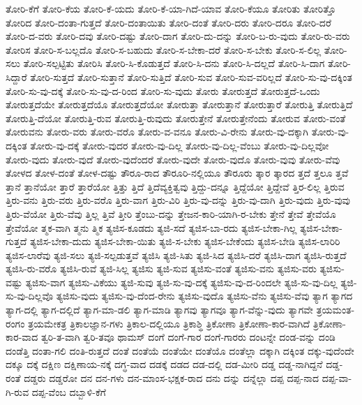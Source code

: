 {ತೋರಿ-ಕೆಗೆ
ತೋರಿ-ಕೆಯ
ತೋರಿ-ಕೆ-ಯದು
ತೋರಿ-ಕೆ-ಯಾ-ಗಿದೆ-ಯಾವ
ತೋರಿ-ಕೆಯೂ
ತೋರಿತು
ತೋರಿತ್ತೊ
ತೋರಿದ
ತೋರಿ-ದಂತಾ-ಗುತ್ತದೆ
ತೋರಿ-ದಂತಾಯಿತು
ತೋರಿ-ದಂತೆ
ತೋರಿ-ದರು
ತೋರಿ-ದರೂ
ತೋರಿ-ದರೆ
ತೋರಿ-ದ-ವರು
ತೋರಿ-ದವು
ತೋರಿ-ದಷ್ಟು
ತೋರಿ-ದಾಗ
ತೋರಿ-ದು-ದನ್ನು
ತೋರಿ-ಬ-ರು-ವುದು
ತೋರಿ-ರು-ವರು
ತೋರಿಸ
ತೋರಿ-ಸ-ಬಲ್ಲದೊ
ತೋರಿ-ಸ-ಬಹುದು
ತೋರಿ-ಸ-ಬೇಕಾ-ದರೆ
ತೋರಿ-ಸ-ಬೇಕು
ತೋರಿ-ಸ-ಲಿಲ್ಲ
ತೋರಿ-ಸಲು
ತೋರಿ-ಸಲ್ಪಟ್ಟಿತು
ತೋರಿಸಿ
ತೋರಿ-ಸಿ-ಕೊಡುತ್ತದೆ
ತೋರಿ-ಸಿ-ದನು
ತೋರಿ-ಸಿ-ದಲ್ಲದೆ
ತೋರಿ-ಸಿ-ದಾಗ
ತೋರಿ-ಸಿದ್ದಾರೆ
ತೋರಿ-ಸುತ್ತದೆ
ತೋರಿ-ಸುತ್ತಾನೆ
ತೋರಿ-ಸುತ್ತಿದೆ
ತೋರಿ-ಸುವ
ತೋರಿ-ಸುವ-ವರಿಲ್ಲದೆ
ತೋರಿ-ಸು-ವು-ದಕ್ಕಿಂತ
ತೋರಿ-ಸು-ವು-ದಕ್ಕೆ
ತೋರಿ-ಸು-ವು-ದ-ರಿಂದ
ತೋರಿ-ಸು-ವುದು
ತೋರು
ತೋರುತ್ತದೆ
ತೋರುತ್ತದೆ-ಒಂದು
ತೋರುತ್ತದೆಯೇ
ತೋರುತ್ತದೆಯೊ
ತೋರುತ್ತದೆಯೋ
ತೋರುತ್ತಾ
ತೋರುತ್ತಾನೆ
ತೋರುತ್ತಾರೆ
ತೋರುತ್ತಿ
ತೋರುತ್ತಿದೆ
ತೋರುತ್ತಿ-ದೆಯೋ
ತೋರುತ್ತಿ-ರುವ
ತೋರುತ್ತಿ-ರುವುದು
ತೋರುತ್ತೇನೆ
ತೋರುತ್ತೇನೆಂದು
ತೋರುವ
ತೋರು-ವಂತೆ
ತೋರುವನು
ತೋರು-ವರು
ತೋರು-ವರೊ
ತೋರು-ವ-ವನೂ
ತೋರು-ವಿ-ರೇನು
ತೋರು-ವು-ದಕ್ಕಾಗಿ
ತೋರು-ವು-ದಕ್ಕಿಂತ
ತೋರು-ವು-ದಕ್ಕೆ
ತೋರು-ವುದರ
ತೋರು-ವು-ದಿಲ್ಲ
ತೋರು-ವು-ದಿಲ್ಲ-ವೆಂಬು
ತೋರು-ವು-ದಿಲ್ಲವೋ
ತೋರು-ವುದು
ತೋರು-ವುದೆ
ತೋರು-ವುದೆಂದರೆ
ತೋರು-ವುದೇ
ತೋರು-ವುದೊ
ತೋರು-ವುವು
ತೋರು-ವೆವು
ತೋಳದ
ತೋಳ-ದಂತೆ
ತೋಳ-ದಷ್ಟು
ತೌರೂ-ರಾದ
ತೌರೂರಿ-ನಲ್ಲಿಯೂ
ತೌರೂರು
ತ್ಕಾರ
ತ್ಕಾರದ
ತ್ತದೆ
ತ್ತಲೂ
ತ್ತವೆ
ತ್ತಾನೆ
ತ್ತಾನೆಯೋ
ತ್ತಾರೆ
ತ್ತಾರೆಯೋ
ತ್ತಿತ್ತು
ತ್ತಿದೆ
ತ್ತಿದೆವ್ಯಕ್ತಿತ್ವವು
ತ್ತಿದ್ದು-ದನ್ನೂ
ತ್ತಿದ್ದೆಯೋ
ತ್ತಿದ್ದೇವೆ
ತ್ತಿರ-ಲಿಲ್ಲ
ತ್ತಿರುವ
ತ್ತಿರು-ವನು
ತ್ತಿರು-ವರು
ತ್ತಿರು-ವರೊ
ತ್ತಿರು-ವಾಗ
ತ್ತಿರು-ವಿರಿ
ತ್ತಿರು-ವು-ದನ್ನು
ತ್ತಿರು-ವು-ದಾಗಿ
ತ್ತಿರು-ವುದು
ತ್ತಿರು-ವುವು
ತ್ತಿರು-ವೆಯೋ
ತ್ತಿರು-ವೆವು
ತ್ತಿಲ್ಲ
ತ್ತಿವೆ
ತ್ತೀರಿ
ತ್ತೆಂಬು-ದನ್ನು
ತ್ತೇಜನ-ಕಾರಿ-ಯಾಗಿ-ರ-ಬೇಕು
ತ್ತೇನೆ
ತ್ತೇವೆ
ತ್ತೇವೆಯೊ
ತ್ತೇವೆಯೋ
ತ್ಮಕ-ವಾಗಿ
ತ್ಮನು
ತ್ಮಿಕ
ತ್ಯಜಿಸ-ಕೂಡದು
ತ್ಯಜಿ-ಸದೆ
ತ್ಯಜಿಸ-ಬಾ-ರದು
ತ್ಯಜಿಸ-ಬೇಕಾ-ಗಿಲ್ಲ
ತ್ಯಜಿಸ-ಬೇಕಾ-ಗುತ್ತದೆ
ತ್ಯಜಿಸ-ಬೇಕಾ-ದುದು
ತ್ಯಜಿಸ-ಬೇಕಾ-ಯಿತು
ತ್ಯಜಿ-ಸ-ಬೇಕು
ತ್ಯಜಿಸ-ಬೇಕೆಂದು
ತ್ಯಜಿಸ-ಬೇಡಿ
ತ್ಯಜಿಸ-ಲಾರಿರಿ
ತ್ಯಜಿಸ-ಲಾರೆವು
ತ್ಯಜಿ-ಸಲು
ತ್ಯಜಿ-ಸಲ್ಪಡುತ್ತವೆ
ತ್ಯಜಿಸಿ
ತ್ಯಜಿ-ಸಿತು
ತ್ಯಜಿ-ಸಿದ
ತ್ಯಜಿಸಿ-ದರೆ
ತ್ಯಜಿಸಿ-ದಾಗ
ತ್ಯಜಿಸಿ-ರುತ್ತದೆ
ತ್ಯಜಿಸಿ-ರು-ವರೊ
ತ್ಯಜಿಸಿ-ರುವೆ
ತ್ಯಜಿ-ಸಿಲ್ಲ
ತ್ಯಜಿಸು
ತ್ಯಜಿ-ಸುವ
ತ್ಯಜಿಸು-ವಂತೆ
ತ್ಯಜಿಸು-ವನು
ತ್ಯಜಿಸು-ವರು
ತ್ಯಜಿಸು-ವಷ್ಟು
ತ್ಯಜಿಸು-ವಾಗ
ತ್ಯಜಿಸು-ವಿಕೆಯು
ತ್ಯಜಿ-ಸುವು
ತ್ಯಜಿ-ಸು-ವು-ದಕ್ಕೆ
ತ್ಯಜಿಸು-ವು-ದ-ರಿಂದಲೇ
ತ್ಯಜಿ-ಸು-ವು-ದಿಲ್ಲ
ತ್ಯಜಿ-ಸು-ವು-ದಿಲ್ಲವೊ
ತ್ಯಜಿಸು-ವುದು
ತ್ಯಜಿಸು-ವು-ದೆಂದ-ರೇನು
ತ್ಯಜಿಸು-ವುದೊ
ತ್ಯಜಿಸು-ವೆನು
ತ್ಯಜಿಸು-ವೆವು
ತ್ಯಾಗ
ತ್ಯಾಗದ
ತ್ಯಾಗ-ದಲ್ಲಿ
ತ್ಯಾಗ-ದಲ್ಲಿದೆ
ತ್ಯಾಗ-ಮಾ-ಡಲಿ
ತ್ಯಾಗ-ಮಾಡಿ
ತ್ಯಾಗವು
ತ್ಯಾಗವೂ
ತ್ಯಾಗ-ವೆನ್ನು-ವುದು
ತ್ಯಾಗವೇ
ತ್ರಯಮಂತ-ರಂಗಂ
ತ್ರಯಮೇಕತ್ರ
ತ್ರಿಕಾಲಜ್ಞಾನ-ಗಳು
ತ್ರಿಕಾಲ-ದಲ್ಲಿಯೂ
ತ್ರಿಕಾಶ್ಥಿ
ತ್ರಿಕೋಣಾ
ತ್ರಿಕೋಣಾ-ಕಾರ-ವಾಗಿದೆ
ತ್ರಿಕೋಣಾ-ಕಾರ-ವಾದ
ತ್ವರಿ-ತ-ವಾಗಿ
ತ್ವರಿ-ತವೂ
ಥಾಮಸ್
ದಂಗೆ
ದಂಗೆ-ಗಾರ
ದಂಗೆ-ಗಾರರು
ದಂಟನ್ನೇ
ದಂಡ-ವನ್ನು
ದಂಡಿ
ದಂಡೆತ್ತಿ
ದಂತಾ-ಗಲಿ
ದಂತಿ-ರುತ್ತದೆ
ದಂತೆ
ದಂತೆಯೆ
ದಂತೆಯೇ
ದಂತೆಯೊ
ದಂತೆಲ್ಲಾ
ದಕ್ಕಾಗಿ
ದಕ್ಕಿಂತ
ದಕ್ಕು-ವುದೆಂದೇ
ದಕ್ಕೂ
ದಕ್ಕೆ
ದಕ್ಷಿಣ
ದಕ್ಷಿಣಾಯ-ನಕ್ಕೆ
ದಗ್ಧ-ವಾದ
ದಡಕ್ಕೆ
ದಡದ
ದಡ-ದಲ್ಲಿ
ದಡ-ಮೀರಿ
ದಡ್ಡ
ದಡ್ಡ-ನಾಗಿದ್ದನೆ
ದಡ್ಡ-ರಂತೆ
ದಡ್ಡರು
ದಡ್ಡರೋ
ದನ
ದನ-ಗಳು
ದನ-ಮಾಂಸ-ಭಕ್ಷಕ-ರಾದ
ದನು
ದನ್ನು
ದನ್ನೆಲ್ಲಾ
ದಪ್ಪ
ದಪ್ಪ-ನಾದ
ದಪ್ಪ-ವಾ-ಗಿ-ರುವ
ದಪ್ಪ-ವೆಂಬ
ದಬ್ಬಾಳಿ-ಕೆಗೆ
}
